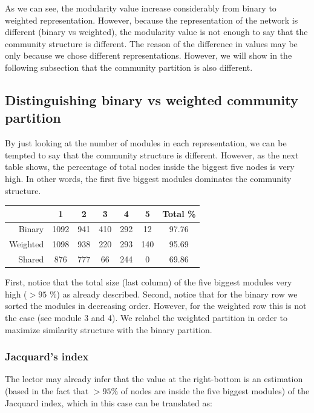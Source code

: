 \documentclass[12pt]{article}
\begin{document}
As we can see, the modularity value increase considerably from
binary to weighted representation. However, because the
representation of the network is different (binary vs weighted),
the modularity value is not enough to say that the community
structure is different. The reason of the difference in values
may be only because we chose different representations. However,
we will show in the following subsection that the community partition
is also different. 

\subsection{Distinguishing binary vs weighted community partition}

By just looking at the number of modules in each representation,
we can be tempted to say that the community structure is different.
However, as the next table shows, the percentage of total nodes
inside the biggest five nodes is very high. In other words, the
first five biggest modules dominates the community structure.


\begin{center}
	\begin{tabular}{ | r | c | c | c | c | c | c |}
		\hline
		& 1 & 2 & 3 & 4 & 5 & Total \%\\ \hline
		Binary & 1092 & 941 & 410 & 292 & 12 & 97.76 \\ \hline
		Weighted & 1098 & 938 & 220 & 293 & 140 & 95.69 \\ \hline
		Shared & 876 & 777 & 66 & 244 & 0 & 69.86\\ \hline
		
	\end{tabular}
\end{center}

First, notice that the total size (last column) of the five biggest modules very high ($>95$ \%) as already described. Second, notice
that for the binary row we sorted the modules in decreasing order.
However, for the weighted row this is not the case (see module 3 and 4).
We relabel the weighted partition in order to maximize similarity
structure with the binary partition.

\subsubsection{Jacquard's index}

The lector may already infer that the value at the right-bottom
is an estimation (based in the fact that $>95$\% of nodes are inside the five biggest modules) of the Jacquard index, which in this case
can be translated as:
\end{document}
